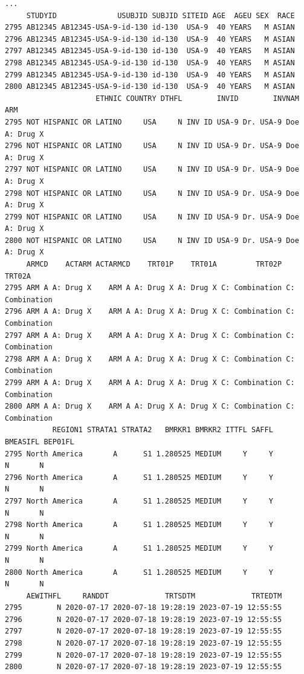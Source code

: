 \documentclass[
  letterpaper,
  DIV=11,
  numbers=noendperiod]{scrreprt}
\begin{document}
\begin{tcolorbox}[enhanced jigsaw, leftrule=.75mm, arc=.35mm, colback=white, colframe=quarto-callout-note-color-frame, opacityback=0, toprule=.15mm, bottomrule=.15mm, rightrule=.15mm, left=2mm, breakable]
\begin{minipage}[t]{\textwidth - 5.5mm}
\begin{verbatim}
...
     STUDYID              USUBJID SUBJID SITEID AGE  AGEU SEX  RACE
2795 AB12345 AB12345-USA-9-id-130 id-130  USA-9  40 YEARS   M ASIAN
2796 AB12345 AB12345-USA-9-id-130 id-130  USA-9  40 YEARS   M ASIAN
2797 AB12345 AB12345-USA-9-id-130 id-130  USA-9  40 YEARS   M ASIAN
2798 AB12345 AB12345-USA-9-id-130 id-130  USA-9  40 YEARS   M ASIAN
2799 AB12345 AB12345-USA-9-id-130 id-130  USA-9  40 YEARS   M ASIAN
2800 AB12345 AB12345-USA-9-id-130 id-130  USA-9  40 YEARS   M ASIAN
                     ETHNIC COUNTRY DTHFL        INVID        INVNAM       ARM
2795 NOT HISPANIC OR LATINO     USA     N INV ID USA-9 Dr. USA-9 Doe A: Drug X
2796 NOT HISPANIC OR LATINO     USA     N INV ID USA-9 Dr. USA-9 Doe A: Drug X
2797 NOT HISPANIC OR LATINO     USA     N INV ID USA-9 Dr. USA-9 Doe A: Drug X
2798 NOT HISPANIC OR LATINO     USA     N INV ID USA-9 Dr. USA-9 Doe A: Drug X
2799 NOT HISPANIC OR LATINO     USA     N INV ID USA-9 Dr. USA-9 Doe A: Drug X
2800 NOT HISPANIC OR LATINO     USA     N INV ID USA-9 Dr. USA-9 Doe A: Drug X
     ARMCD    ACTARM ACTARMCD    TRT01P    TRT01A         TRT02P         TRT02A
2795 ARM A A: Drug X    ARM A A: Drug X A: Drug X C: Combination C: Combination
2796 ARM A A: Drug X    ARM A A: Drug X A: Drug X C: Combination C: Combination
2797 ARM A A: Drug X    ARM A A: Drug X A: Drug X C: Combination C: Combination
2798 ARM A A: Drug X    ARM A A: Drug X A: Drug X C: Combination C: Combination
2799 ARM A A: Drug X    ARM A A: Drug X A: Drug X C: Combination C: Combination
2800 ARM A A: Drug X    ARM A A: Drug X A: Drug X C: Combination C: Combination
           REGION1 STRATA1 STRATA2   BMRKR1 BMRKR2 ITTFL SAFFL BMEASIFL BEP01FL
2795 North America       A      S1 1.280525 MEDIUM     Y     Y        N       N
2796 North America       A      S1 1.280525 MEDIUM     Y     Y        N       N
2797 North America       A      S1 1.280525 MEDIUM     Y     Y        N       N
2798 North America       A      S1 1.280525 MEDIUM     Y     Y        N       N
2799 North America       A      S1 1.280525 MEDIUM     Y     Y        N       N
2800 North America       A      S1 1.280525 MEDIUM     Y     Y        N       N
     AEWITHFL     RANDDT             TRTSDTM             TRTEDTM
2795        N 2020-07-17 2020-07-18 19:28:19 2023-07-19 12:55:55
2796        N 2020-07-17 2020-07-18 19:28:19 2023-07-19 12:55:55
2797        N 2020-07-17 2020-07-18 19:28:19 2023-07-19 12:55:55
2798        N 2020-07-17 2020-07-18 19:28:19 2023-07-19 12:55:55
2799        N 2020-07-17 2020-07-18 19:28:19 2023-07-19 12:55:55
2800        N 2020-07-17 2020-07-18 19:28:19 2023-07-19 12:55:55

\end{verbatim}
\end{minipage}
\end{tcolorbox}
\end{document}
